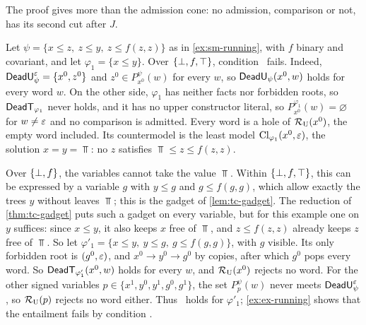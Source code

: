 The proof gives more than the admission cone: no admission, comparison or not, has its
second cut after $J$.

\begin{example}\label{ex:un-running}
Let $\psi=\{x\le z,\ z\le y,\ z\le f(z,z)\}$ as in \cref{ex:sm-running}, with
$f$ binary and covariant, and let $\varphi_1=\{x\le y\}$. Over $\{\bot,f,\top\}$,
condition \CondU\ fails. Indeed, $\mathsf{DeadU}^\varepsilon_\psi=\{x^0,z^0\}$ and
$z^0\in P^\psi_{x^0}(w)$ for every $w$, so $\mathsf{DeadU}_\psi(x^0,w)$ holds for every
word $w$. On the other side, $\varphi_1$ has neither facts nor
forbidden roots, so $\mathsf{DeadT}_{\varphi_1}$ never holds, and it has no upper
constructor literal, so $P^{\varphi_1}_{x^0}(w)=\varnothing$ for $w\ne\varepsilon$ and
no comparison is admitted. Every word is a hole of $\mathcal R_{\mathrm U}(x^0)$, the empty word
included. Its countermodel is the least model $\operatorname{Cl}_{\varphi_1}(x^0,\varepsilon)$, the
solution $x=y=\Top$: no $z$ satisfies $\Top\le z\le f(z,z)$.

Over $\{\bot,f\}$, the variables cannot take the value $\Top$. Within $\{\bot,f,\top\}$, this
can be expressed by a variable $g$ with $y\le g$ and $g\le f(g,g)$, which
allow exactly the trees $y$ without leaves $\Top$; this is the gadget of
\cref{lem:tc-gadget}. The reduction of \cref{thm:tc-gadget} puts such a gadget
on every variable, but for this example one on $y$ suffices: since $x\le y$, it also
keeps $x$ free of $\Top$, and $z\le f(z,z)$ already keeps $z$ free of $\Top$.
So let $\varphi'_1=\{x\le y,\ y\le g,\ g\le f(g,g)\}$, with $g$ visible. Its only
forbidden root is $(g^0,\varepsilon)$, and $x^0\to y^0\to g^0$ by copies, after which
$g^0$ pops every word. So $\mathsf{DeadT}_{\varphi'_1}(x^0,w)$ holds for every $w$, and
$\mathcal R_{\mathrm U}(x^0)$ rejects no word. For the other signed variables
$p\in\{x^1,y^0,y^1,g^0,g^1\}$, the set $P^\psi_p(w)$ never meets
$\mathsf{DeadU}^\varepsilon_\psi$, so $\mathcal R_{\mathrm U}(p)$ rejects no word either. Thus \CondU\ holds for
$\varphi'_1$; \cref{ex:ex-running} shows that the entailment fails by
condition \CondII.
\end{example}

